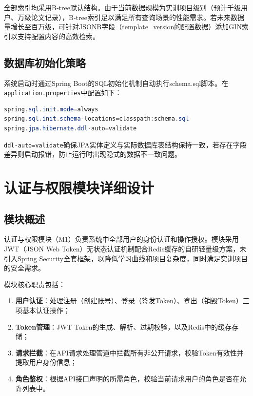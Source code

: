 全部索引均采用B-tree默认结构。由于当前数据规模为实训项目级别（预计千级用户、万级论文记录），B-tree索引足以满足所有查询场景的性能需求。若未来数据量增长至百万级，可针对JSONB字段（template\_version的配置数据）添加GIN索引以支持配置内容的高效检索。

\subsection{数据库初始化策略}

系统启动时通过Spring Boot的SQL初始化机制自动执行schema.sql脚本。在\verb|application.properties|中配置如下：

\begin{lstlisting}[language=Java,caption={SQL初始化配置}]
spring.sql.init.mode=always
spring.sql.init.schema-locations=classpath:schema.sql
spring.jpa.hibernate.ddl-auto=validate
\end{lstlisting}

\verb|ddl-auto=validate|确保JPA实体定义与实际数据库表结构保持一致，若存在字段差异则启动报错，防止运行时出现隐式的数据不一致问题。

\section{认证与权限模块详细设计}

\subsection{模块概述}

认证与权限模块（M1）负责系统中全部用户的身份认证和操作授权。模块采用JWT（JSON Web Token）无状态认证机制配合Redis缓存的自研轻量级方案，未引入Spring Security全套框架，以降低学习曲线和项目复杂度，同时满足实训项目的安全需求。

模块核心职责包括：
\begin{enumerate}
    \item \textbf{用户认证}：处理注册（创建账号）、登录（签发Token）、登出（销毁Token）三项基本认证操作；
    \item \textbf{Token管理}：JWT Token的生成、解析、过期校验，以及Redis中的缓存存储；
    \item \textbf{请求拦截}：在API请求处理管道中拦截所有非公开请求，校验Token有效性并提取用户身份信息；
    \item \textbf{角色鉴权}：根据API接口声明的所需角色，校验当前请求用户的角色是否在允许列表中。
\end{enumerate}

